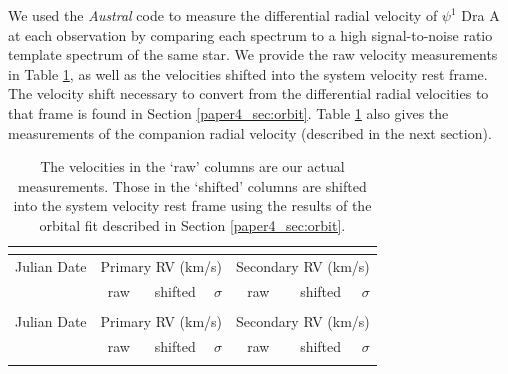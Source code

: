 We used the \emph{Austral} code \citep{Endl2000} to measure the differential radial velocity of $\psi^1$ Dra A at each observation by comparing each spectrum to a high signal-to-noise ratio template spectrum of the same star. We provide the raw velocity measurements in Table \ref{paper4_tab:rv_data}, as well as the velocities shifted into the system velocity rest frame. The velocity shift necessary to convert from the differential radial velocities to that frame is found in Section \ref{paper4_sec:orbit}. Table \ref{paper4_tab:rv_data} also gives the measurements of the companion radial velocity (described in the next section).


\begin{small}
\begin{longtable}{lrrrrrr}
    
    \caption{The velocities in the `raw' columns are our actual measurements. Those in the `shifted' columns are shifted into the system velocity rest frame using the results of the orbital fit described in Section \ref{paper4_sec:orbit}.} \\
  \label{paper4_tab:rv_data}

    \\ \hline
    Julian Date & \multicolumn{3}{c}{Primary RV (km/s)} & \multicolumn{3}{c}{Secondary RV (km/s)} \\
& raw & shifted & $\sigma$  & raw & shifted  & $\sigma$ \\ \hline
    \endfirsthead

    \\ \hline
    Julian Date & \multicolumn{3}{c}{Primary RV (km/s)} & \multicolumn{3}{c}{Secondary RV (km/s)} \\
& raw & shifted & $\sigma$  & raw & shifted  & $\sigma$ \\ \hline
    \endhead

    \hline
    \endfoot

    \hline
    \endlastfoot



\end{longtable}
\end{small}
